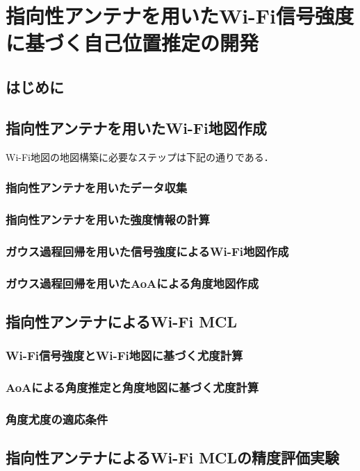 \chapter{指向性アンテナを用いたWi-Fi信号強度に基づく自己位置推定の開発}
\label{cha:field_experiments}
\graphicspath{{figures/05}}

\section{はじめに}
\section{指向性アンテナを用いたWi-Fi地図作成}
Wi-Fi地図の地図構築に必要なステップは下記の通りである．
\subsection{指向性アンテナを用いたデータ収集}
\subsection{指向性アンテナを用いた強度情報の計算}
\subsection{ガウス過程回帰を用いた信号強度によるWi-Fi地図作成}
\subsection{ガウス過程回帰を用いたAoAによる角度地図作成}

\section{指向性アンテナによるWi-Fi MCL}
\subsection{Wi-Fi信号強度とWi-Fi地図に基づく尤度計算}
\subsection{AoAによる角度推定と角度地図に基づく尤度計算}
\subsection{角度尤度の適応条件}

\section{指向性アンテナによるWi-Fi MCLの精度評価実験}
